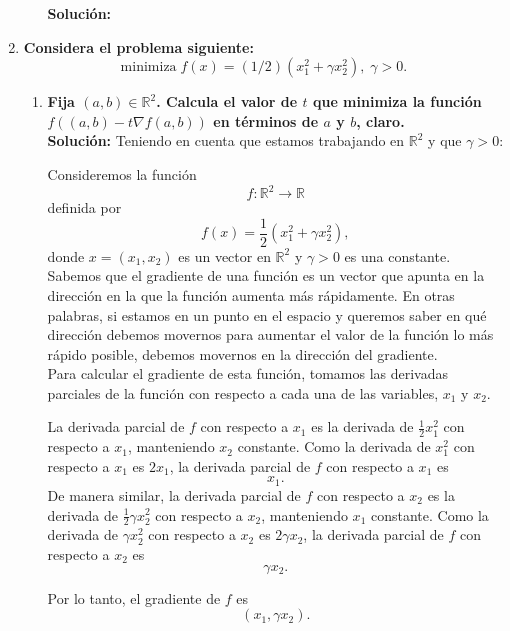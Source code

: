 \begin{enumerate}
\begin{enumerate}[(a)]
	    \textbf{Solución:}

    \end{enumerate}

    \item \textbf{\boldmath Considera el problema siguiente:
    $$\text{minimiza} \; f(x)=(1/2)\left(x_1^2+\gamma x^2_2\right),\; \gamma >0.$$} 
    \begin{enumerate}[\bfseries (a)]

	\item \textbf{\boldmath Fija $(a,b)\in \mathbb{R}^2$. Calcula el valor de $t$ que minimiza la función $f\left((a,b)-t\nabla f(a,b)\right)$ en términos de $a$ y $b$, claro.}\\ 

	    \textbf{Solución:} Teniendo en cuenta que estamos trabajando en $\mathbb{R}^2$ y que $\gamma > 0$:

	    Consideremos la función $$f: \mathbb{R}^2 \rightarrow \mathbb{R}$$ definida por $$f(x) = \frac{1}{2}(x_1^2 + \gamma x_2^2),$$ donde $x = (x_1, x_2)$ es un vector en $\mathbb{R}^2$ y $\gamma > 0$ es una constante.\\

	    Sabemos que el gradiente de una función es un vector que apunta en la dirección en la que la función aumenta más rápidamente. En otras palabras, si estamos en un punto en el espacio y queremos saber en qué dirección debemos movernos para aumentar el valor de la función lo más rápido posible, debemos movernos en la dirección del gradiente.\\

	    Para calcular el gradiente de esta función, tomamos las derivadas parciales de la función con respecto a cada una de las variables, $x_1$ y $x_2$. 

	    La derivada parcial de $f$ con respecto a $x_1$ es la derivada de $\frac{1}{2}x_1^2$ con respecto a $x_1$, manteniendo $x_2$ constante. Como la derivada de $x_1^2$ con respecto a $x_1$ es $2x_1$, la derivada parcial de $f$ con respecto a $x_1$ es 
	    $$x_1.$$ 
	    De manera similar, la derivada parcial de $f$ con respecto a $x_2$ es la derivada de $\frac{1}{2}\gamma x_2^2$ con respecto a $x_2$, manteniendo $x_1$ constante. Como la derivada de $\gamma x_2^2$ con respecto a $x_2$ es $2\gamma x_2$, la derivada parcial de $f$ con respecto a $x_2$ es 
	    $$\gamma x_2.$$

	    Por lo tanto, el gradiente de $f$ es 
	    $$(x_1, \gamma x_2).$$


\end{enumerate}
\end{enumerate}
